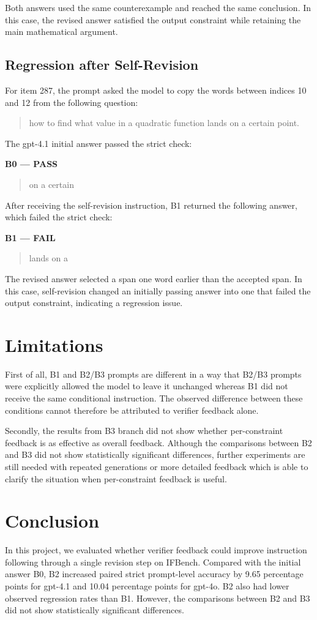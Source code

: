 \documentclass[conference]{IEEEtran}
\begin{document}
Both answers used the same counterexample and reached the same conclusion. In this case, the revised answer satisfied the output constraint while retaining the main mathematical argument.
\subsection{Regression after Self-Revision}
For item 287, the prompt asked the model to copy the words between indices 10 and 12 from the following question:
\begin{quote}
how to find what value in a quadratic function lands on a certain point.
\end{quote}

The gpt-4.1 initial answer passed the strict check:

\noindent\textbf{B0 --- PASS}
\begin{quote}
on a certain
\end{quote}

After receiving the self-revision instruction, B1 returned the following answer, which failed the strict check:

\noindent\textbf{B1 --- FAIL}
\begin{quote}
lands on a
\end{quote}

The revised answer selected a span one word earlier than the accepted span. In this case, self-revision changed an initially passing answer into one that failed the output constraint, indicating a regression issue.

\section{Limitations}
First of all, B1 and B2/B3 prompts are different in a way that B2/B3 prompts were explicitly allowed the model to leave it unchanged whereas B1 did not receive the same conditional instruction. The observed difference between these conditions cannot therefore be attributed to verifier feedback alone.

Secondly, the results from B3 branch did not show whether per-constraint feedback is as effective as overall feedback. Although the comparisons between B2 and B3 did not show statistically significant differences, further experiments are still needed with repeated generations or more detailed feedback which is able to clarify the situation when per-constraint feedback is useful.

\section{Conclusion}
In this project, we evaluated whether verifier feedback could improve instruction following through a single revision step on IFBench. Compared with the initial answer B0, B2 increased paired strict prompt-level accuracy by 9.65 percentage points for gpt-4.1 and 10.04 percentage points for gpt-4o. B2 also had lower observed regression rates than B1. However, the comparisons between B2 and B3 did not show statistically significant differences.
\end{document}
